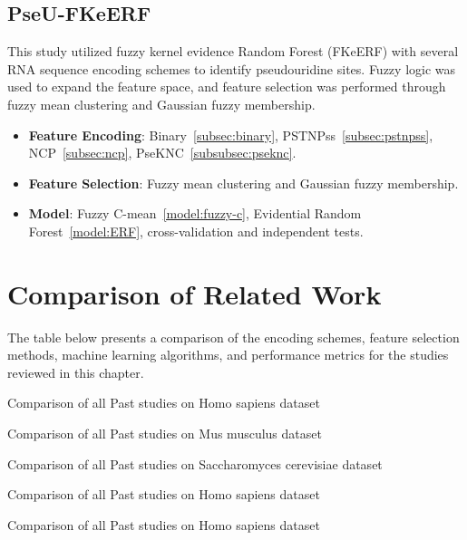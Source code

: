     \subsection*{PseU-FKeERF \cite{chen_fuzzy_2024}}\label{subsec:PseU-FKeERF}
      This study utilized fuzzy kernel evidence Random Forest (FKeERF) with several RNA sequence encoding schemes to identify pseudouridine sites.
      Fuzzy logic was used to expand the feature space, and feature selection was performed through fuzzy mean clustering and Gaussian fuzzy membership.

      \begin{itemize}
        \item \textbf{Feature Encoding}: Binary~\ref{subsec:binary}, PSTNPss~\ref{subsec:pstnpss}, NCP~\ref{subsec:ncp}, PseKNC~\ref{subsubsec:pseknc}.
        \item \textbf{Feature Selection}: Fuzzy mean clustering and Gaussian fuzzy membership.
        \item \textbf{Model}: Fuzzy C-mean~\ref{model:fuzzy-c}, Evidential Random Forest~\ref{model:ERF}, cross-validation and independent tests.
      \end{itemize}


  \section{Comparison of Related Work}\label{sec:comparison-of-related-work}
    The table below presents a comparison of the encoding schemes, feature selection methods, machine learning algorithms, and performance metrics for the studies reviewed in this chapter.

    \begin{table*}[h!]
      \centering
      
      \caption{Comparison of all Past studies on Homo sapiens dataset}
      \label{tab:human_comp_table}
    \end{table*}

    \begin{table}[h!]
      \centering
      
      \caption{Comparison of all Past studies on Mus musculus dataset}
      \label{tab:mouse_comp_table}
    \end{table}

    \begin{table}[h!]
      \centering
      
      \caption{Comparison of all Past studies on Saccharomyces cerevisiae dataset}
      \label{tab:yeast_comp_table}
    \end{table}

    \begin{table*}[h!]
      \centering
      
      \caption{Comparison of all Past studies on Homo sapiens dataset}
      \label{tab:human_indv_comp_table}
    \end{table*}

        \begin{table*}[h!]
      \centering
      
      \caption{Comparison of all Past studies on Homo sapiens dataset}
      \label{tab:yeast_indv_comp_table}
    \end{table*}
